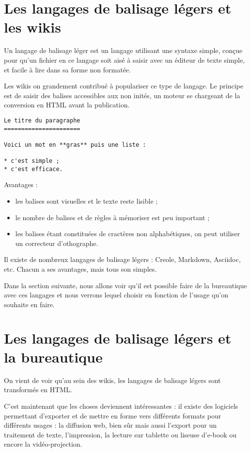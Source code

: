 \documentclass[]{article}
\begin{document}
\section{Les langages de balisage légers et les wikis}

Un langage de balisage léger est un langage utilisant une syntaxe
simple, conçue pour qu'un fichier en ce langage soit aisé à saisir avec
un éditeur de texte simple, et facile à lire dans sa forme non formatée.

Les wikis on grandement contribué à populariser ce type de langage. Le
principe est de saisir des balises accessibles aux non inités, un moteur
se chargeant de la conversion en HTML avant la publication.

\begin{verbatim}
Le titre du paragraphe
======================

Voici un mot en **gras** puis une liste :

* c'est simple ;
* c'est efficace.
\end{verbatim}
Avantages :

\begin{itemize}
\item
  les balises sont visuelles et le texte reste lisible ;
\item
  le nombre de balises et de règles à mémoriser est peu important ;
\item
  les balises étant constituées de cractères non alphabétiques, on peut
  utiliser un correcteur d'othographe.
\end{itemize}
Il existe de nombreux langages de balisage légers : Creole, Markdown,
Asciidoc, etc. Chacun a ses avantages, mais tous son simples.

Dans la section suivante, nous allons voir qu'il est possible faire de
la bureautique avec ces langages et nous verrons lequel choisir en
fonction de l'usage qu'on souhaite en faire.

\section{Les langages de balisage légers et la bureautique}

On vient de voir qu'au sein des wikis, les langages de balisage légers
sont transformés en HTML.

C'est maintenant que les choses deviennent intéressantes : il existe des
logiciels permettant d'exporter et de mettre en forme vers différents
formats pour différents usages : la diffusion web, bien sûr mais aussi
l'export pour un traitement de texte, l'impression, la lecture sur
tablette ou liseuse d'e-book ou encore la vidéo-projection.
\end{document}
